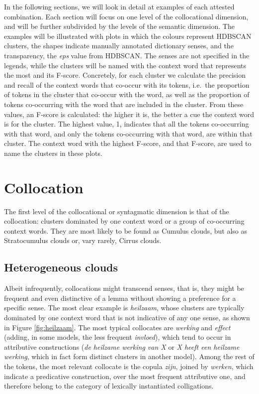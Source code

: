 \documentclass[
]{book}
\begin{document}
In the following sections, we will look in detail at examples of each attested combination. Each section will focus on one level of the collocational dimension, and will be further subdivided by the levels of the semantic dimension.
The examples will be illustrated with plots in which the colours represent HDBSCAN clusters, the shapes indicate manually annotated dictionary senses, and the transparency, the \emph{eps} value from HDBSCAN. The senses are not specified in the legends, while the clusters will be named with the context word that represents the most and its F-score. Concretely, for each cluster we calculate the precision and recall of the context words that co-occur with its tokens, i.e.~the proportion of tokens in the cluster that co-occur with the word, as well as the proportion of tokens co-occurring with the word that are included in the cluster. From these values, an F-score is calculated: the higher it is, the better a cue the context word is for the cluster. The highest value, 1, indicates that all the tokens co-occurring with that word, and only the tokens co-occurring with that word, are within that cluster. The context word with the highest F-score, and that F-score, are used to name the clusters in these plots.

\hypertarget{collocation}{%
\section{Collocation}\label{collocation}}

The first level of the collocational or syntagmatic dimension is that of the collocation: clusters dominated by one context word or a group of co-occurring context words. They are most likely to be found as Cumulus clouds, but also as Stratocumulus clouds or, vary rarely, Cirrus clouds.

\hypertarget{heterogeneous-clouds}{%
\subsection{Heterogeneous clouds}\label{heterogeneous-clouds}}

Albeit infrequently, collocations might transcend senses, that is, they might be frequent and even distinctive of a lemma without showing a preference for a specific sense.
The most clear example is \emph{heilzaam}, whose clusters are typically dominated by one context word that is not indicative of any one sense, as shown in Figure \ref{fig:heilzaam}. The most typical collocates are \emph{werking} and \emph{effect} (adding, in some models, the less frequent \emph{invloed}), which tend to occur in attributive constructions (\emph{de heilzame werking van X} or \emph{X heeft een heilzame werking}, which in fact form distinct clusters in another model). Among the rest of the tokens, the most relevant collocate is the copula \emph{zijn}, joined by \emph{werken}, which indicate a predicative construction, over the most frequent attributive one, and therefore belong to the category of lexically instantiated colligations.
\end{document}
